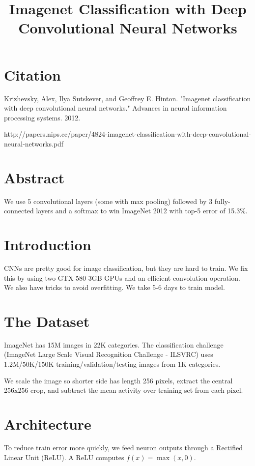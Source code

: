 \documentclass[a4paper]{article}
\title{Imagenet Classification with Deep Convolutional Neural Networks}
\date{}
\begin{document}
\maketitle

\section{Citation}

Krizhevsky, Alex, Ilya Sutskever, and Geoffrey E. Hinton. "Imagenet classification with deep convolutional neural networks." Advances in neural information processing systems. 2012.

http://papers.nips.cc/paper/4824-imagenet-classification-with-deep-convolutional-neural-networks.pdf

\section{Abstract}
We use 5 convolutional layers (some with max
pooling) followed by 3 fully-connected layers and a softmax to win ImageNet 2012
with top-5 error of 15.3\%.

\section{Introduction}

CNNs are pretty good for image classification, but they are hard to train. We
fix this by using two GTX 580 3GB GPUs and an efficient convolution operation.
We also have tricks to avoid overfitting. We take 5-6 days to train model.

\section{The Dataset}
ImageNet has 15M images in 22K categories.
The classification challenge (ImageNet Large Scale Visual
Recognition Challenge - ILSVRC) uses 1.2M/50K/150K training/validation/testing
images from 1K categories.

We scale the image so shorter side has length 256 pixels, extract the
central 256x256 crop, and subtract the mean activity over training set from
each pixel.

\section{Architecture}
To reduce train error more quickly, we feed neuron outputs through a
Rectified Linear Unit (ReLU). A ReLU computes $f(x) = \max(x, 0)$.
\end{document}
